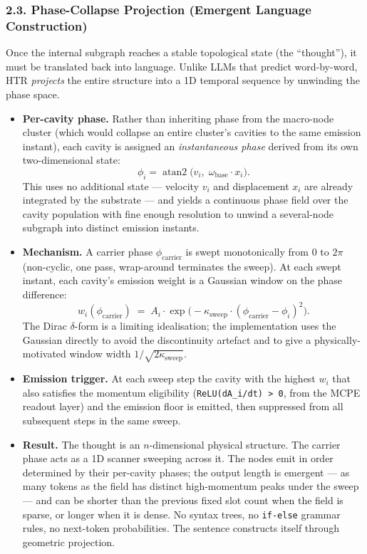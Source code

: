 \documentclass[
  11pt,
  a4paper,
]{article}
\begin{document}
\subsubsection{2.3. Phase-Collapse Projection (Emergent Language
Construction)}\label{phase-collapse-projection-emergent-language-construction}

Once the internal subgraph reaches a stable topological state (the
``thought''), it must be translated back into language. Unlike LLMs that
predict word-by-word, HTR \emph{projects} the entire structure into a 1D
temporal sequence by unwinding the phase space.

\begin{itemize}
\item
  \textbf{Per-cavity phase.} Rather than inheriting phase from the
  macro-node cluster (which would collapse an entire cluster's cavities
  to the same emission instant), each cavity is assigned an
  \emph{instantaneous phase} derived from its own two-dimensional state:
  \[ \phi_i = \operatorname{atan2}\!\bigl(v_i,\; \omega_{\text{base}} \cdot x_i\bigr). \]
  This uses no additional state --- velocity \(v_i\) and displacement
  \(x_i\) are already integrated by the substrate --- and yields a
  continuous phase field over the cavity population with fine enough
  resolution to unwind a several-node subgraph into distinct emission
  instants.
\item
  \textbf{Mechanism.} A carrier phase \(\phi_{\text{carrier}}\) is swept
  monotonically from \(0\) to \(2\pi\) (non-cyclic, one pass,
  wrap-around terminates the sweep). At each swept instant, each
  cavity's emission weight is a Gaussian window on the phase difference:
  \[ w_i(\phi_{\text{carrier}}) \;=\; A_i \cdot \exp\!\bigl(-\kappa_{\text{sweep}} \cdot (\phi_{\text{carrier}} - \phi_i)^2\bigr). \]
  The Dirac \(\delta\)-form is a limiting idealisation; the
  implementation uses the Gaussian directly to avoid the discontinuity
  artefact and to give a physically-motivated window width
  \(1/\sqrt{2\kappa_{\text{sweep}}}\).
\item
  \textbf{Emission trigger.} At each sweep step the cavity with the
  highest \(w_i\) that also satisfies the momentum eligibility
  (\texttt{ReLU(dA\_i/dt)\ \textgreater{}\ 0}, from the MCPE readout
  layer) and the emission floor is emitted, then suppressed from all
  subsequent steps in the same sweep.
\item
  \textbf{Result.} The thought is an \(n\)-dimensional physical
  structure. The carrier phase acts as a 1D scanner sweeping across it.
  The nodes emit in order determined by their per-cavity phases; the
  output length is emergent --- as many tokens as the field has distinct
  high-momentum peaks under the sweep --- and can be shorter than the
  previous fixed slot count when the field is sparse, or longer when it
  is dense. No syntax trees, no \texttt{if-else} grammar rules, no
  next-token probabilities. The sentence constructs itself through
  geometric projection.
\end{itemize}
\end{document}
